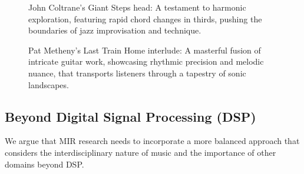 \begin{figure}
    \caption[]{\small{John Coltrane's Giant Steps head: A testament to harmonic exploration, featuring rapid chord changes in thirds, pushing the boundaries of jazz improvisation and technique.}}
    \label{fig:giant_steps}
\end{figure}

\begin{figure}
    \caption[]{\small{Pat Metheny's Last Train Home interlude: A masterful fusion of intricate guitar work, showcasing rhythmic precision and melodic nuance, that transports listeners through a tapestry of sonic landscapes.}}
    \label{fig:last_train}
\end{figure}


\subsection{Beyond Digital Signal Processing (DSP)}

We argue that MIR research needs to incorporate a more balanced approach that considers the interdisciplinary nature of music and the importance of other domains beyond DSP.